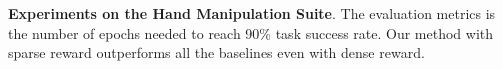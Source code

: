 \begin{table}[t]
\centering
\small
\newcommand\dapgwidth{0.15}
 
\vspace{-1ex}
\\

\vspace{-1ex}
\\

\vspace{-1ex}
\caption{\textbf{Experiments on the Hand Manipulation Suite}.
The evaluation metrics is the number of epochs needed to reach 90\% task success rate. Our method with sparse reward outperforms all the baselines even with dense reward.
}
\label{tab:dapg:result}
\end{table}